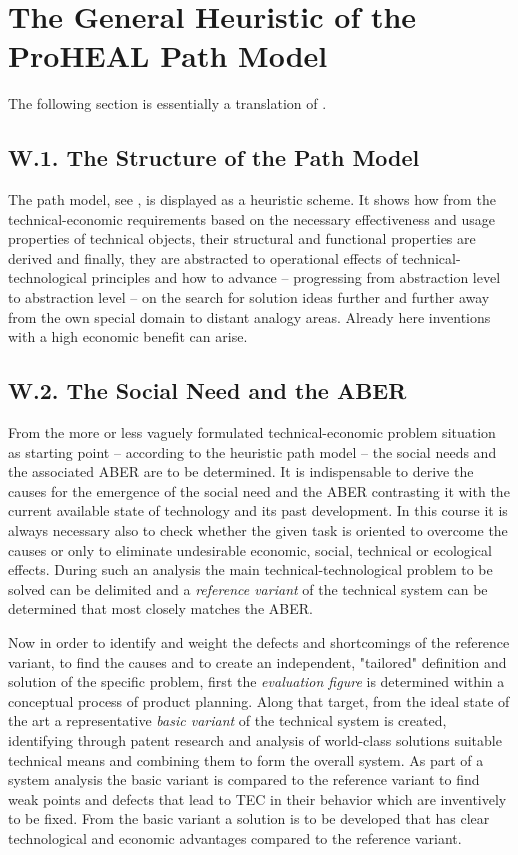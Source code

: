 \documentclass[11pt,a4paper]{article}
\begin{document}
\section{The General Heuristic of the ProHEAL Path Model}

The following section is essentially a translation of \cite[ch. 5]{RM-21}.

\subsection*{W.1. The Structure of the Path Model}

The path model, see \cite[Appendix 1]{ProHEAL-21}, is displayed as a heuristic
scheme. It shows how from the technical-economic requirements based on the
necessary effectiveness and usage properties of technical objects, their
structural and functional properties are derived and finally, they are
abstracted to operational effects of technical-technological principles and
how to advance -- progressing from abstraction level to abstraction level --
on the search for solution ideas further and further away from the own special
domain to distant analogy areas.  Already here inventions with a high economic
benefit can arise.

\subsection*{W.2. The Social Need and the ABER}

From the more or less vaguely formulated technical-economic problem situation
as starting point -- according to the heuristic path model -- the social needs
and the associated ABER are to be determined. It is indispensable to derive
the causes for the emergence of the social need and the ABER contrasting it
with the current available state of technology and its past development.  In
this course it is always necessary also to check whether the given task is
oriented to overcome the causes or only to eliminate undesirable economic,
social, technical or ecological effects.  During such an analysis the main
technical-technological problem to be solved can be delimited and a
\emph{reference variant} of the technical system can be determined that most
closely matches the ABER.

Now in order to identify and weight the defects and shortcomings of the
reference variant, to find the causes and to create an independent, "tailored"
definition and solution of the specific problem, first the \emph{evaluation
  figure} is determined within a conceptual process of product planning. Along
that target, from the ideal state of the art a representative \emph{basic
  variant} of the technical system is created, identifying through patent
research and analysis of world-class solutions suitable technical means and
combining them to form the overall system. As part of a system analysis the
basic variant is compared to the reference variant to find weak points and
defects that lead to TEC in their behavior which are inventively to be fixed.
From the basic variant a solution is to be developed that has clear
technological and economic advantages compared to the reference variant.
\end{document}
